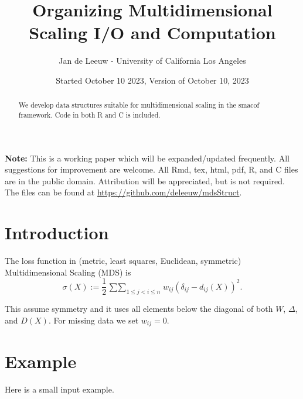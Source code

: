 \documentclass[
  12pt,
]{article}
\title{Organizing Multidimensional Scaling I/O and Computation}
\author{Jan de Leeuw - University of California Los Angeles}
\date{Started October 10 2023, Version of October 10, 2023}
\newcommand{\jis}{\mathop{\sum\sum}_{1\leq j<i\leq n}}
\begin{document}
\maketitle
\begin{abstract}
We develop data structures suitable for multidimensional scaling in the smacof framework. Code in both R and C is included.
\end{abstract}

{
\setcounter{tocdepth}{4}
\tableofcontents
}
\textbf{Note:} This is a working paper which will be expanded/updated frequently. All suggestions for improvement are welcome. All Rmd, tex, html, pdf, R, and C files are in the public domain. Attribution
will be appreciated, but is not required. The files can be found at
\url{https://github.com/deleeuw/mdsStruct}.

\section{Introduction}\label{introduction}

The loss function in (metric, least squares, Euclidean, symmetric) Multidimensional Scaling (MDS)
is
\[
\sigma(X):=\frac12\jis w_{ij}(\delta_{ij}-d_{ij}(X))^2.
\]

This assume symmetry and it uses all elements below the diagonal of both \(W\), \(\Delta\), and \(D(X)\).
For missing data we set \(w_{ij}=0\).

\section{Example}\label{example}

Here is a small input example.
\end{document}
